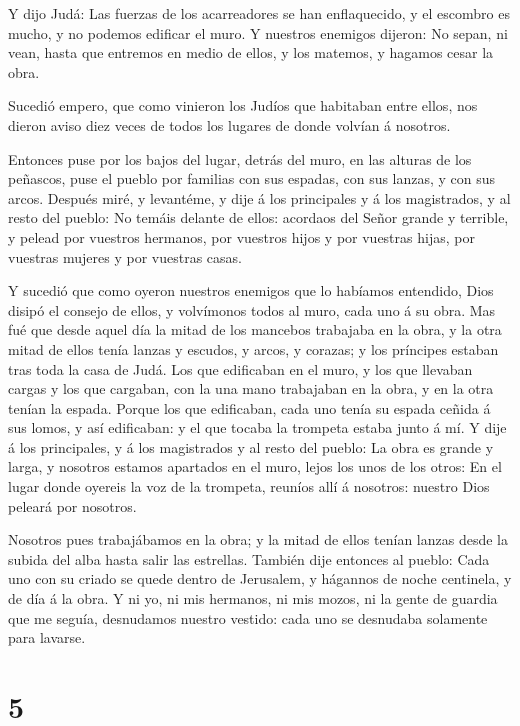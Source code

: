  Y dijo Judá: Las fuerzas de los acarreadores se han
enflaquecido, y el escombro es mucho, y no podemos edificar el muro.
 Y nuestros enemigos dijeron: No sepan, ni vean, hasta que
entremos en medio de ellos, y los matemos, y hagamos cesar la obra.

 Sucedió empero, que como vinieron los Judíos que habitaban
entre ellos, nos dieron aviso diez veces de todos los lugares de donde
volvían á nosotros.

 Entonces puse por los bajos del lugar, detrás del muro, en
las alturas de los peñascos, puse el pueblo por familias con sus
espadas, con sus lanzas, y con sus arcos.  Después miré, y
levantéme, y dije á los principales y á los magistrados, y al resto del
pueblo: No temáis delante de ellos: acordaos del Señor grande y
terrible, y pelead por vuestros hermanos, por vuestros hijos y por
vuestras hijas, por vuestras mujeres y por vuestras casas.

 Y sucedió que como oyeron nuestros enemigos que lo
habíamos entendido, Dios disipó el consejo de ellos, y volvímonos todos
al muro, cada uno á su obra.  Mas fué que desde aquel día
la mitad de los mancebos trabajaba en la obra, y la otra mitad de ellos
tenía lanzas y escudos, y arcos, y corazas; y los príncipes estaban tras
toda la casa de Judá.  Los que edificaban en el muro, y los
que llevaban cargas y los que cargaban, con la una mano trabajaban en la
obra, y en la otra tenían la espada.  Porque los que
edificaban, cada uno tenía su espada ceñida á sus lomos, y así
edificaban: y el que tocaba la trompeta estaba junto á mí. 
Y dije á los principales, y á los magistrados y al resto del pueblo: La
obra es grande y larga, y nosotros estamos apartados en el muro, lejos
los unos de los otros:  En el lugar donde oyereis la voz de
la trompeta, reuníos allí á nosotros: nuestro Dios peleará por nosotros.

 Nosotros pues trabajábamos en la obra; y la mitad de ellos
tenían lanzas desde la subida del alba hasta salir las estrellas.
 También dije entonces al pueblo: Cada uno con su criado se
quede dentro de Jerusalem, y hágannos de noche centinela, y de día á la
obra.  Y ni yo, ni mis hermanos, ni mis mozos, ni la gente
de guardia que me seguía, desnudamos nuestro vestido: cada uno se
desnudaba solamente para lavarse.

\hypertarget{section-4}{%
\section{5}\label{section-4}}

